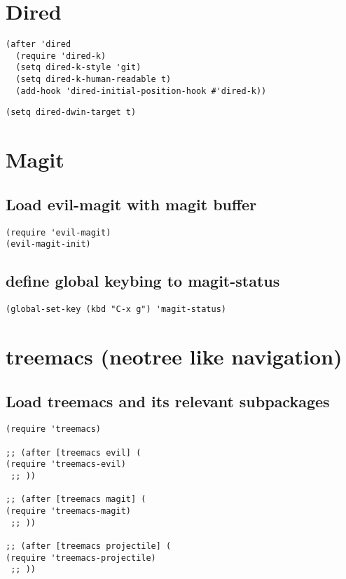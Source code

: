 \documentclass[11pt]{article}
\begin{document}
\section*{Dired}
\label{sec:org50fe3b6}

\begin{verbatim}
(after 'dired
  (require 'dired-k)
  (setq dired-k-style 'git)
  (setq dired-k-human-readable t)
  (add-hook 'dired-initial-position-hook #'dired-k))
\end{verbatim}

\begin{verbatim}
(setq dired-dwin-target t)
\end{verbatim}


\section*{Magit}
\label{sec:org11b8a8e}

\subsection*{Load evil-magit with magit buffer}
\label{sec:orgb97d849}

\begin{verbatim}
(require 'evil-magit)
(evil-magit-init)
\end{verbatim}


\subsection*{define global keybing to magit-status}
\label{sec:org4eedf4e}

\begin{verbatim}
(global-set-key (kbd "C-x g") 'magit-status)
\end{verbatim}


\section*{treemacs (neotree like navigation)}
\label{sec:orgbb1c654}

\subsection*{Load treemacs and its relevant subpackages}
\label{sec:orgb30f0a4}
\begin{verbatim}
(require 'treemacs)

;; (after [treemacs evil] (
(require 'treemacs-evil)
 ;; ))

;; (after [treemacs magit] (
(require 'treemacs-magit)
 ;; ))

;; (after [treemacs projectile] (
(require 'treemacs-projectile)
 ;; ))
\end{verbatim}
\end{document}

